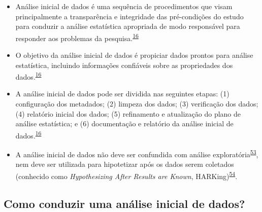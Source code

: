 \documentclass[
]{book}
\begin{document}
\begin{itemize}
\item
  Análise inicial de dados é uma sequência de procedimentos que visam principalmente a transparência e integridade das pré-condições do estudo para conduzir a análise estatística apropriada de modo responsável para responder aos problemas da pesquisa.\textsuperscript{\protect\hyperlink{ref-Baillie2022}{16}}
\item
  O objetivo da análise inicial de dados é propiciar dados prontos para análise estatística, incluindo informações confiáveis sobre as propriedades dos dados.\textsuperscript{\protect\hyperlink{ref-Baillie2022}{16}}
\item
  A análise inicial de dados pode ser dividida nas seguintes etapas: (1) configuração dos metadados; (2) limpeza dos dados; (3) verificação dos dados; (4) relatório inicial dos dados; (5) refinamento e atualização do plano de análise estatística; e (6) documentação e relatório da análise inicial de dados.\textsuperscript{\protect\hyperlink{ref-Baillie2022}{16}}
\item
  A análise inicial de dados não deve ser confundida com análise exploratória\textsuperscript{\protect\hyperlink{ref-Ferketich1986}{53}}, nem deve ser utilizada para hipotetizar após os dados serem coletados (conhecido como \emph{Hypothesizing After Results are Known}, HARKing)\textsuperscript{\protect\hyperlink{ref-Kerr1998}{54}}.
\end{itemize}

\hypertarget{como-conduzir-uma-anuxe1lise-inicial-de-dados}{%
\subsection{Como conduzir uma análise inicial de dados?}\label{como-conduzir-uma-anuxe1lise-inicial-de-dados}}
\end{document}
